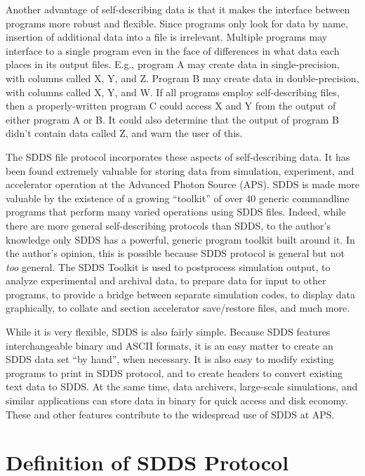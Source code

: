 \documentclass[11pt]{article}
\begin{document}
Another advantage of self-describing data is that it makes the
interface between programs more robust and flexible.  Since programs
only look for data by name, insertion of additional data into a file
is irrelevant.  Multiple programs may interface to a single program
even in the face of differences in what data each places in its output
files.  E.g., program A may create data in single-precision, with
columns called X, Y, and Z.  Program B may create data in
double-precision, with columns called X, Y, and W.  If all programs
employ self-describing files, then a properly-written program C could
access X and Y from the output of either program A or B.  It could
also determine that the output of program B didn't contain data called
Z, and warn the user of this.

The SDDS file protocol incorporates these aspects of self-describing
data.  It has been found extremely valuable for storing data from
simulation, experiment, and accelerator operation at the Advanced
Photon Source (APS).  SDDS is made more valuable by the existence of a
growing ``toolkit'' of over 40 generic commandline programs that
perform many varied operations using SDDS files.  Indeed, while there
are more general self-describing protocols than SDDS, to the author's
knowledge only SDDS has a powerful, generic program toolkit built
around it.  In the author's opinion, this is possible because SDDS
protocol is general but not {\em too} general.  The SDDS Toolkit is
used to postprocess simulation output, to analyze experimental and
archival data, to prepare data for input to other programs, to provide
a bridge between separate simulation codes, to display data
graphically, to collate and section accelerator save/restore files,
and much more.

While it is very flexible, SDDS is also fairly simple.  Because SDDS
features interchangeable binary and ASCII formats, it is an easy
matter to create an SDDS data set ``by hand'', when necessary.  It is
also easy to modify existing programs to print in SDDS protocol, and
to create headers to convert existing text data to SDDS.  At the same
time, data archivers, large-scale simulations, and similar
applications can store data in binary for quick access and disk
economy.  These and other features contribute to the widespread use of
SDDS at APS.

\section{Definition of SDDS Protocol}
\end{document}
